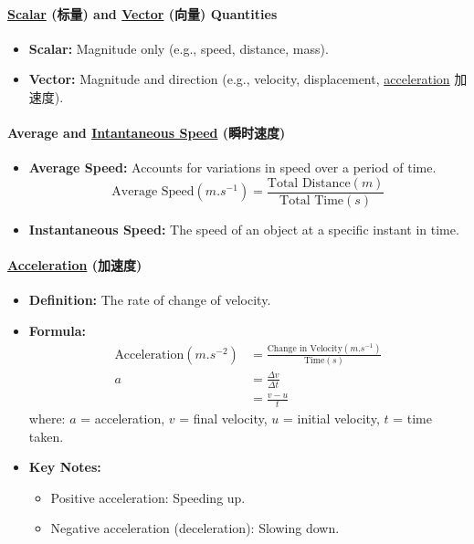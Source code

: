 \paragraph{\underline{Scalar} (标量) and \underline{Vector} (向量) Quantities}
\begin{itemize}
    \item \textbf{Scalar:} Magnitude only (e.g., speed, distance, mass).
    \item \textbf{Vector:} Magnitude and direction (e.g., velocity, displacement, \underline{acceleration} 加速度).
\end{itemize}

\paragraph{Average and \underline{Intantaneous Speed} (瞬时速度)}
\begin{itemize}
    \item \textbf{Average Speed:} Accounts for variations in speed over a period of time.
    \begin{equation}
        \text{Average Speed} (\unit{m.s^{-1}}) = \frac{\text{Total Distance} (\unit{m})}{\text{Total Time} (\unit{s})}
    \end{equation}
    \item \textbf{Instantaneous Speed:} The speed of an object at a specific instant in time.
\end{itemize}

\paragraph{\underline{Acceleration} (加速度)}
\begin{itemize}
    \item \textbf{Definition:} The rate of change of velocity.
    \item \textbf{Formula:}
    \begin{equation}
        \begin{split}
            \text{Acceleration} (\unit{m.s^{-2}}) &= \frac{\text{Change in Velocity} (\unit{m.s^{-1}})}{\text{Time} (\unit{s})} \\
            a &= \frac{\Delta v}{\Delta t} \\
            &= \frac{v - u}{t}
        \end{split}
    \end{equation}
    where: $a$ = acceleration, $v$ = final velocity, $u$ = initial velocity, $t$ = time taken.
    \item \textbf{Key Notes:}
    \begin{itemize}
        \item Positive acceleration: Speeding up.
        \item Negative acceleration (deceleration): Slowing down.
    \end{itemize}
\end{itemize}